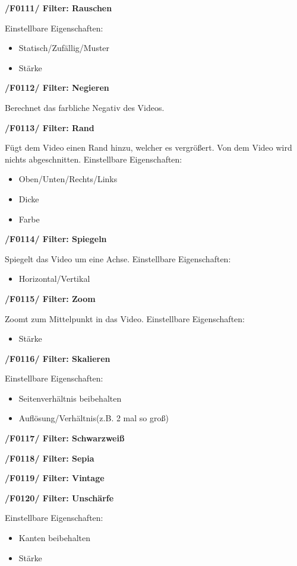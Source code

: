 \documentclass[parskip=full]{scrartcl}
\begin{document}
\textbf{/F0111/ Filter: Rauschen}

Einstellbare Eigenschaften:
\begin{itemize}
\item Statisch/Zufällig/Muster
\item Stärke
\end{itemize}

\textbf{/F0112/ Filter: Negieren}

Berechnet das farbliche Negativ des Videos.

\textbf{/F0113/ Filter: Rand}

Fügt dem Video einen Rand hinzu, welcher es vergrößert. Von dem Video wird nichts abgeschnitten.
Einstellbare Eigenschaften:
\begin{itemize}
\item Oben/Unten/Rechts/Links
\item Dicke
\item Farbe
\end{itemize}

\textbf{/F0114/ Filter: Spiegeln}

Spiegelt das Video um eine Achse.
Einstellbare Eigenschaften:
\begin{itemize}
\item Horizontal/Vertikal
\end{itemize}

\textbf{/F0115/ Filter: Zoom}

Zoomt zum Mittelpunkt in das Video.
Einstellbare Eigenschaften:
\begin{itemize}
\item Stärke
\end{itemize}

\textbf{/F0116/ Filter: Skalieren}

Einstellbare Eigenschaften:
\begin{itemize}
\item Seitenverhältnis beibehalten
\item Auflösung/Verhältnis(z.B. 2 mal so groß)
\end{itemize}

\textbf{/F0117/ Filter: Schwarzweiß}

\textbf{/F0118/ Filter: Sepia}

\textbf{/F0119/ Filter: Vintage}

\textbf{/F0120/ Filter: Unschärfe}

Einstellbare Eigenschaften:
\begin{itemize}
\item Kanten beibehalten
\item Stärke
\end{itemize}
\end{document}
